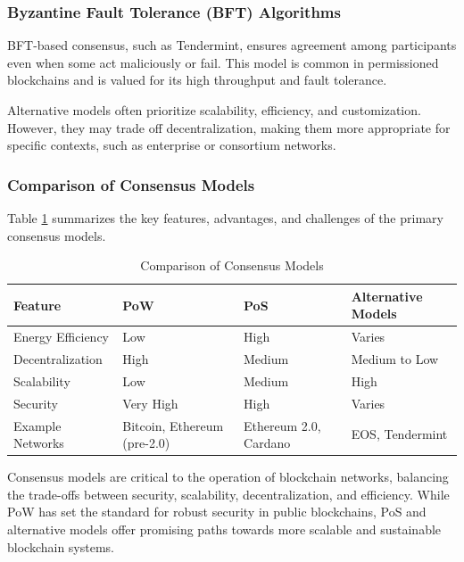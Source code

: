 \subsubsection{Byzantine Fault Tolerance (BFT) Algorithms}
BFT-based consensus, such as Tendermint, ensures agreement among participants even when some act maliciously or fail. This model is common in permissioned blockchains and is valued for its high throughput and fault tolerance.


Alternative models often prioritize scalability, efficiency, and customization. However, they may trade off decentralization, making them more appropriate for specific contexts, such as enterprise or consortium networks.

\subsubsection{Comparison of Consensus Models}

Table \ref{table:ConsensusComparison} summarizes the key features, advantages, and challenges of the primary consensus models. \cite{cachin_blockchain_2017}

\begin{table}[h!]
    \centering
    \caption{Comparison of Consensus Models}
    \label{table:ConsensusComparison}
    \begin{tabular}{|l|l|l|l|}
        \hline
        \textbf{Feature} & \textbf{PoW} & \textbf{PoS} & \textbf{Alternative Models} \\ \hline
        Energy Efficiency & Low & High & Varies \\ \hline
        Decentralization & High & Medium & Medium to Low \\ \hline
        Scalability & Low & Medium & High \\ \hline
        Security & Very High & High & Varies \\ \hline
        Example Networks & Bitcoin, Ethereum (pre-2.0) & Ethereum 2.0, Cardano & EOS, Tendermint \\ \hline
    \end{tabular}
\end{table}

Consensus models are critical to the operation of blockchain networks, balancing the trade-offs between security, scalability, decentralization, and efficiency. While PoW has set the standard for robust security in public blockchains, PoS and alternative models offer promising paths towards more scalable and sustainable blockchain systems. 



